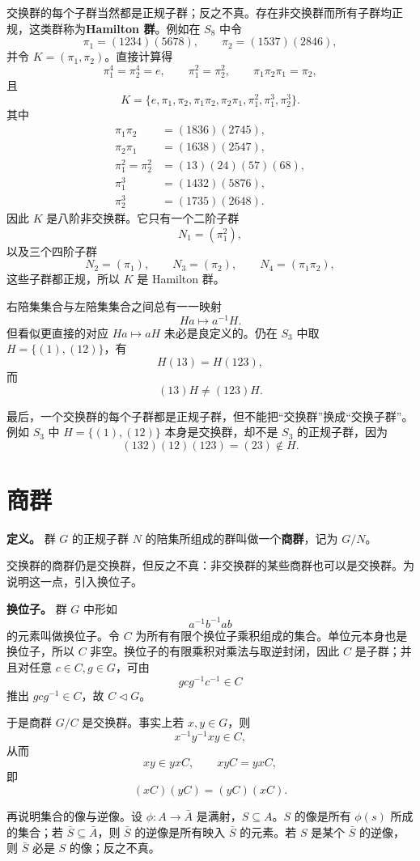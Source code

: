 交换群的每个子群当然都是正规子群；反之不真。存在非交换群而所有子群均正规，这类群称为\textbf{Hamilton 群}。例如在 $S_8$ 中令
\[
\pi_1=(1234)(5678),
\qquad
\pi_2=(1537)(2846),
\]
并令 $K=(\pi_1,\pi_2)$。直接计算得
\[
\pi_1^4=\pi_2^4=e,
\qquad
\pi_1^2=\pi_2^2,
\qquad
\pi_1\pi_2\pi_1=\pi_2,
\]
且
\[
K=\{e,\pi_1,\pi_2,\pi_1\pi_2,\pi_2\pi_1,\pi_1^2,\pi_1^3,\pi_2^3\}.
\]
其中
\begin{align*}
\pi_1\pi_2&=(1836)(2745),\\
\pi_2\pi_1&=(1638)(2547),\\
\pi_1^2=\pi_2^2&=(13)(24)(57)(68),\\
\pi_1^3&=(1432)(5876),\\
\pi_2^3&=(1735)(2648).
\end{align*}
因此 $K$ 是八阶非交换群。它只有一个二阶子群
\[
N_1=(\pi_1^2),
\]
以及三个四阶子群
\[
N_2=(\pi_1),\qquad N_3=(\pi_2),\qquad N_4=(\pi_1\pi_2),
\]
这些子群都正规，所以 $K$ 是 Hamilton 群。

右陪集集合与左陪集集合之间总有一一映射
\[
Ha\longmapsto a^{-1}H.
\]
但看似更直接的对应 $Ha\mapsto aH$ 未必是良定义的。仍在 $S_3$ 中取 $H=\{(1),(12)\}$，有
\[
H(13)=H(123),
\]
而
\[
(13)H\ne(123)H.
\]

最后，一个交换群的每个子群都是正规子群，但不能把“交换群”换成“交换子群”。例如 $S_3$ 中 $H=\{(1),(12)\}$ 本身是交换群，却不是 $S_3$ 的正规子群，因为
\[
(132)(12)(123)=(23)\notin H.
\]

\section{商群}

\textbf{定义。} 群 $G$ 的正规子群 $N$ 的陪集所组成的群叫做一个\textbf{商群}，记为 $G/N$。

交换群的商群仍是交换群，但反之不真：非交换群的某些商群也可以是交换群。为说明这一点，引入换位子。

\textbf{换位子。} 群 $G$ 中形如
\[
a^{-1}b^{-1}ab
\]
的元素叫做换位子。令 $C$ 为所有有限个换位子乘积组成的集合。单位元本身也是换位子，所以 $C$ 非空。换位子的有限乘积对乘法与取逆封闭，因此 $C$ 是子群；并且对任意 $c\in C,g\in G$，可由
\[
gcg^{-1}c^{-1}\in C
\]
推出 $gcg^{-1}\in C$，故 $C\triangleleft G$。

于是商群 $G/C$ 是交换群。事实上若 $x,y\in G$，则
\[
x^{-1}y^{-1}xy\in C,
\]
从而
\[
xy\in yxC,
\qquad
xyC=yxC,
\]
即
\[
(xC)(yC)=(yC)(xC).
\]

再说明集合的像与逆像。设 $\phi:A\to\bar A$ 是满射，$S\subseteq A$。$S$ 的像是所有 $\phi(s)$ 所成的集合；若 $\bar S\subseteq\bar A$，则 $\bar S$ 的逆像是所有映入 $\bar S$ 的元素。若 $S$ 是某个 $\bar S$ 的逆像，则 $\bar S$ 必是 $S$ 的像；反之不真。

